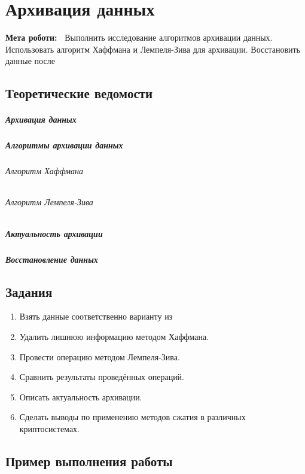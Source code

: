 \chapter{Архивация данных} \label{chapt8}%
\textbf{Мета роботи:~}%
Выполнить исследование алгоритмов архивации данных. Использовать алгоритм
Хаффмана и Лемпеля-Зива для архивации. Восстановить данные после
\section{Теоретические ведомости} \label{sect8_a}
\paragraph{Архивация данных}

\paragraph{Алгоритмы архивации данных}

\subparagraph{Алгоритм Хаффмана}

\subparagraph{Алгоритм Лемпеля-Зива}

\paragraph{Актуальность архивации}

\paragraph{Восстановление данных}

\section{Задания}\label{sect8_b}
%
\begin{enumerate}
  \item Взять данные соответственно варианту из 
  \item Удалить лишнюю информацию методом Хаффмана.
  \item Провести операцию методом Лемпеля-Зива.
  \item Сравнить результаты проведённых операций.
  \item Описать актуальность архивации.
  \item Сделать выводы по применению методов сжатия в различных
      криптосистемах.
\end{enumerate}
\section{Пример выполнения работы}\label{sect8_c}
%
